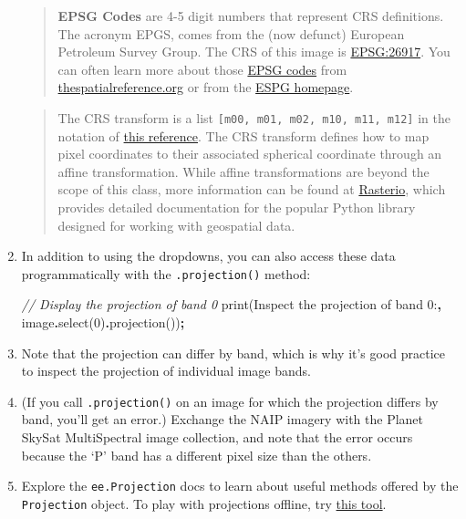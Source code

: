 \documentclass[
]{article}
\newenvironment{Shaded}{\begin{snugshade}}{\end{snugshade}}
\newcommand{\CommentTok}[1]{\textcolor[rgb]{0.56,0.35,0.01}{\textit{#1}}}
\newcommand{\DecValTok}[1]{\textcolor[rgb]{0.00,0.00,0.81}{#1}}
\newcommand{\FunctionTok}[1]{\textcolor[rgb]{0.00,0.00,0.00}{#1}}
\newcommand{\NormalTok}[1]{#1}
\newcommand{\OperatorTok}[1]{\textcolor[rgb]{0.81,0.36,0.00}{\textbf{#1}}}
\newcommand{\StringTok}[1]{\textcolor[rgb]{0.31,0.60,0.02}{#1}}
\begin{document}
\begin{enumerate}
  \begin{quote}
  \textbf{EPSG Codes} are 4-5 digit numbers that represent CRS definitions. The acronym EPGS, comes from the (now defunct) European Petroleum Survey Group. The CRS of this image is \href{https://spatialreference.org/ref/epsg/nad83-utm-zone-17n/}{EPSG:26917}. You can often learn more about those \href{http://www.epsg-registry.org/}{EPSG codes} from \href{http://spatialreference.org/}{thespatialreference.org} or from the \href{https://epsg.org/home.html}{ESPG homepage}.
  \end{quote}

  \begin{quote}
  The CRS transform is a list \texttt{{[}m00,\ m01,\ m02,\ m10,\ m11,\ m12{]}} in the notation of \href{http://docs.oracle.com/javase/7/docs/api/java/awt/geom/AffineTransform.html}{this reference}. The CRS transform defines how to map pixel coordinates to their associated spherical coordinate through an affine transformation. While affine transformations are beyond the scope of this class, more information can be found at \href{https://rasterio.readthedocs.io/en/latest/topics/georeferencing.html}{Rasterio}, which provides detailed documentation for the popular Python library designed for working with geospatial data.
  \end{quote}
\item
  In addition to using the dropdowns, you can also access these data programmatically with the \texttt{.projection()} method:

\begin{Shaded}
\begin{Highlighting}[]
\CommentTok{// Display the projection of band 0}
\FunctionTok{print}\NormalTok{(}\StringTok{\textquotesingle{}Inspect the projection of band 0:\textquotesingle{}}\OperatorTok{,}\NormalTok{ image}\OperatorTok{.}\FunctionTok{select}\NormalTok{(}\DecValTok{0}\NormalTok{)}\OperatorTok{.}\FunctionTok{projection}\NormalTok{())}\OperatorTok{;}
\end{Highlighting}
\end{Shaded}
\item
  Note that the projection can differ by band, which is why it's good practice to inspect the projection of individual image bands.
\item
  (If you call \texttt{.projection()} on an image for which the projection differs by band, you'll get an error.) Exchange the NAIP imagery with the Planet SkySat MultiSpectral image collection, and note that the error occurs because the `P' band has a different pixel size than the others.
\item
  Explore the \texttt{ee.Projection} docs to learn about useful methods offered by the \texttt{Projection} object. To play with projections offline, try \href{http://www.giss.nasa.gov/tools/gprojector/}{this tool}.
\end{enumerate}
\end{document}
